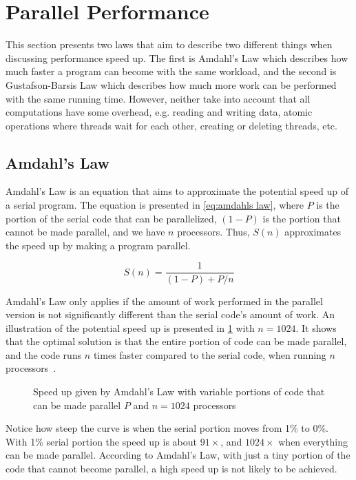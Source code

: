 \section{Parallel Performance}
\label{sec:parallel performance}

This section presents two laws that aim to describe two different things when discussing performance speed up.
The first is Amdahl's Law which describes how much faster a program can become with the same workload, and the second is Gustafson-Barsis Law which describes how much more work can be performed with the same running time.
However, neither take into account that all computations have some overhead, e.g. reading and writing data, atomic operations where threads wait for each other, creating or deleting threads, etc.

\subsection{Amdahl's Law}
\label{sec:amdahls law}

Amdahl's Law is an equation that aims to approximate the potential speed up of a serial program.
The equation is presented in \cref{eq:amdahls law}, where $P$ is the portion of the serial code that can be parallelized, $(1-P)$ is the portion that cannot be made parallel, and we have $n$ processors.
Thus, $S(n)$ approximates the speed up by making a program parallel.

\begin{equation}
  \label{eq:amdahls law}
  S(n) = \frac{1}{(1-P) + P/n}
\end{equation}

Amdahl's Law only applies if the amount of work performed in the parallel version is not significantly different than the serial code's amount of work.
An illustration of the potential speed up is presented in \cref{fig:amdahls law} with $n=1024$.
It shows that the optimal solution is that the entire portion of code can be made parallel, and the code runs $n$ times faster compared to the serial code, when running $n$ processors~\cite{farber2011cuda}.

\begin{figure}[htb]
  \centering
  
  \caption{Speed up given by Amdahl's Law with variable portions of code that can be made parallel $P$ and $n=1024$ processors}
  \label{fig:amdahls law}
\end{figure}

Notice how steep the curve is when the serial portion moves from 1\% to 0\%.
With 1\% serial portion the speed up is about $91\times$, and $1024\times$ when everything can be made parallel.
According to Amdahl's Law, with just a tiny portion of the code that cannot become parallel, a high speed up is not likely to be achieved.

